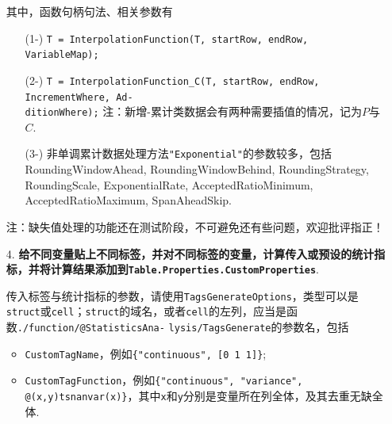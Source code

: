 \documentclass[a4paper, titlepage]{article}
\begin{document}
\begin{enumerate}
{        其中，函数句柄句法、相关参数有
        \begin{enumerate}
            \item [(1-)]\texttt{T = InterpolationFunction(T, startRow, endRow, VariableMap);}
            \item [(2-)]\texttt{T = InterpolationFunction\_C(T, startRow, endRow, IncrementWhere, Ad-}\\\texttt{ditionWhere);} 注：新增-累计类数据会有两种需要插值的情况，记为$P$与$C$.
            \item [(3-)] 非单调累计数据处理方法\texttt{"Exponential"}的参数较多，包括RoundingWindowAhead, RoundingWindowBehind, RoundingStrategy, RoundingScale, ExponentialRate, AcceptedRatioMinimum, AcceptedRatioMaximum, SpanAheadSkip.
        \end{enumerate}

        注：缺失值处理的功能还在测试阶段，不可避免还有些问题，欢迎批评指正！
        }
        
        \item [4.] \textbf{给不同变量贴上不同标签，并对不同标签的变量，计算传入或预设的统计指标，并将计算结果添加到\texttt{Table.Properties.CustomProperties}}.
        
        {\kaishu
        传入标签与统计指标的参数，请使用\texttt{TagsGenerateOptions}，类型可以是\texttt{struct}或\texttt{cell}；\texttt{struct}的域名，或者\texttt{cell}的左列，应当是函数\texttt{./function/@StatisticsAna-} \texttt{lysis/TagsGenerate}的参数名，包括
        \begin{itemize}[itemsep=-1pt,topsep=1pt]
            \item \texttt{CustomTagName}，例如\texttt{\{"continuous", [0 1 1]\}};
            \item \texttt{CustomTagFunction}，例如\texttt{\{"continuous", "variance", @(x,y)tsnanvar(x)\}}，其中\texttt{x}和\texttt{y}分别是变量所在列全体，及其去重无缺全体.
        \end{itemize} 
        }
    \end{enumerate}
\end{document}

